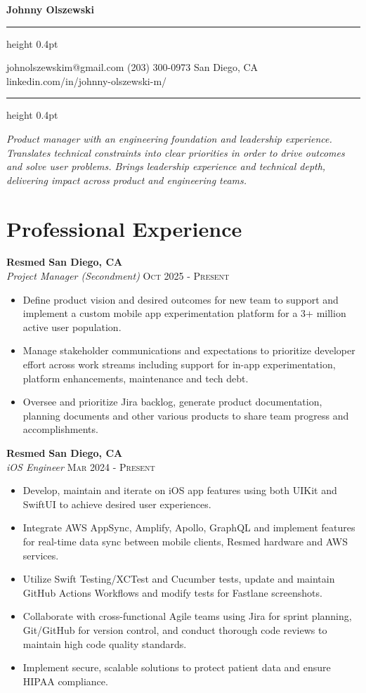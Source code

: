 \documentclass[10pt,letterpaper]{article}
\newcommand{\name}[1]{%
  \begin{center}
    \Large\textbf{#1}
  \end{center}
  \vspace{-0.4em}
  \hrule height 0.4pt
  \vspace{0.2em}
}
\newcommand{\contact}[4]{%
  \begin{center}
    \small #1 \textbar{} #2 \textbar{} #3 \textbar{} #4
  \end{center}
  \vspace{-0.35em}
  \hrule height 0.4pt
  \vspace{0.2em}
}
\newcommand{\summary}[1]{%
  \vspace{-0.2em}
  \begin{center}
    \footnotesize\textit{#1}
  \end{center}
}
\newcommand{\role}[4]{%
  \vspace{0.4em}
  \noindent\textbf{#1} \hfill \textbf{#2}\\
  \noindent\textit{#3} \hfill \textsc{#4}
}
\begin{document}
\small

\name{Johnny Olszewski}

\contact{johnolszewskim@gmail.com}{(203) 300-0973}{San Diego, CA}{linkedin.com/in/johnny-olszewski-m/}

\summary{
  Product manager with an engineering foundation and leadership experience. 
  Translates technical constraints into clear priorities in order to drive outcomes and solve user problems. 
  Brings leadership experience and technical depth, delivering impact across product and engineering teams.
}

\section{Professional Experience}

\vspace{0.4em}

\role{Resmed}{San Diego, CA}{Project Manager (Secondment)}{Oct 2025 - Present}
\begin{itemize}
  \item Define product vision and desired outcomes for new team to support and implement a custom mobile app experimentation platform for a 3+ million active user population.
  \item Manage stakeholder communications and expectations to prioritize developer effort across work streams including support for in-app experimentation, platform enhancements, maintenance and tech debt.
  \item Oversee and prioritize Jira backlog, generate product documentation, planning documents and other various products to share team progress and accomplishments.
\end{itemize}

\vspace{0.4em}

\role{Resmed}{San Diego, CA}{iOS Engineer}{Mar 2024 - Present}
\begin{itemize}
  \item Develop, maintain and iterate on iOS app features using both UIKit and SwiftUI to achieve desired user experiences.
  \item Integrate AWS AppSync, Amplify, Apollo, GraphQL and implement features for real-time data sync between mobile clients, Resmed hardware and AWS services.
  \item Utilize Swift Testing/XCTest and Cucumber tests, update and maintain GitHub Actions Workflows and modify tests for Fastlane screenshots.
  \item Collaborate with cross-functional Agile teams using Jira for sprint planning, Git/GitHub for version control, and conduct thorough code reviews to maintain high code quality standards.
  \item Implement secure, scalable solutions to protect patient data and ensure HIPAA compliance.
\end{itemize}
\end{document}
